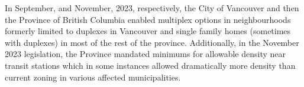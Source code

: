 \documentclass[12pt]{article}
\begin{document}
In September, and November, 2023, respectively, the City of Vancouver and then the Province of British Columbia enabled multiplex options in neighbourhoods formerly limited to duplexes in Vancouver and single family homes (sometimes with duplexes) in most of the rest of the province. Additionally, in the November 2023 legislation, the Province mandated minimums for allowable density near transit stations which in some instances allowed dramatically more density than current zoning in various affected municipalities.
\end{document}
